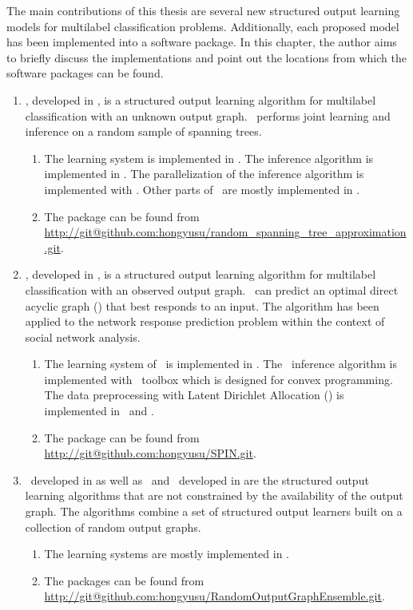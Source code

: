{The main contributions of this thesis are several new structured output learning models for multilabel classification problems.
Additionally, each proposed model has been implemented into a software package.
In this chapter, the author aims to briefly discuss the implementations and point out the locations from which the software packages can be found.

\begin{enumerate}
	\item \rta, developed in , is a structured output learning algorithm for multilabel classification with an unknown output graph. \rta\ performs joint learning and inference on a random sample of spanning trees.
	\begin{enumerate}
		\item The learning system is implemented in \matlab. The inference algorithm is implemented in \cpp. The parallelization of the inference algorithm is implemented with \openmp. Other parts of \rta\ are mostly implemented in \matlab.
		\item The package can be found from \url{http://git@github.com:hongyusu/random_spanning_tree_approximation.git}.
	\end{enumerate}
	
	\item \spin, developed in , is a structured output learning algorithm for multilabel classification with an observed output graph. \spin\ can predict an optimal direct acyclic graph (\daggraph) that best responds to an input. The algorithm has been applied to the network response prediction problem within the context of social network analysis.
	\begin{enumerate}
		\item The learning system of \spin\ is implemented in \matlab. The \sdp\ inference algorithm is implemented with \cvx\ toolbox which is designed for convex programming. The data preprocessing with Latent Dirichlet Allocation (\lda) \citep{Blei03latent} is implemented in \python\ and \matlab.
		\item The package can be found from \url{http://git@github.com:hongyusu/SPIN.git}.
	\end{enumerate}
	
	\item \mve\ developed in  as well as \amm\ and \mam\ developed in  are the structured output learning algorithms that are not constrained by the availability of the output graph. The algorithms combine a set of structured output learners built on a collection of random output graphs.
	\begin{enumerate}
		\item The learning systems are mostly implemented in \matlab.
		\item The packages can be found from \url{http://git@github.com:hongyusu/RandomOutputGraphEnsemble.git}.
	\end{enumerate}
\end{enumerate}




}
